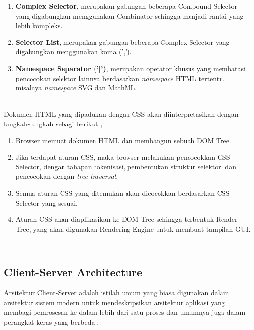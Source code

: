 \documentclass[12pt,a4paper]{article}
\begin{document}
\begin{enumerate}
\begin{itemize}
        \item \textbf{Next-Sibling (+)}, menyatakan operator yang mencocokkan elemen di kanan sebagai elemen pertama yang dikunjungi melalui \textit{parent} kedua elemen tersebut dalam urutan \textit{pre-order traversal}.
        \item \textbf{Column (||)}, menyatakan operator yang mencocokkan simpul yang berada pada sebuah kolom tabel atau grid.
    \end{itemize}
    \item \textbf{Complex Selector}, merupakan gabungan beberapa Compound Selector yang digabungkan menggunakan Combinator sehingga menjadi rantai yang lebih kompleks.
    \item \textbf{Selector List}, merupakan gabungan beberapa Complex Selector yang digabungkan menggunakan koma (',').
    \item \textbf{Namespace Separator ('|')}, merupakan operator khusus yang membatasi pencocokan selektor lainnya berdasarkan \textit{namespace} HTML tertentu, misalnya \textit{namespace} SVG dan MathML.
\end{enumerate} \\


Dokumen HTML yang dipadukan dengan CSS akan diinterpretasikan dengan langkah-langkah sebagi berikut \cite{mozilla-css},
\begin{enumerate}
    \item Browser memuat dokumen HTML dan membangun sebuah DOM Tree.
    \item Jika terdapat aturan CSS, maka browser melakukan pencocokkan CSS Selector, dengan tahapan tokenisasi, pembentukan struktur selektor, dan pencocokan dengan \textit{tree traversal}.
    \item Semua aturan CSS yang ditemukan akan dicocokkan berdasarkan CSS Selector yang sesuai.
    \item Aturan CSS akan diaplikasikan ke DOM Tree sehingga terbentuk Render Tree, yang akan digunakan Rendering Engine untuk membuat tampilan GUI.
\end{enumerate} \\



\subsection{Client-Server Architecture}

Arsitektur Client-Server adalah istilah umum yang biasa digunakan dalam arsitektur sistem modern untuk mendeskripsikan
arsitektur aplikasi yang membagi pemrosesan ke dalam lebih dari satu proses dan umumnya juga dalam perangkat keras yang berbeda \cite{client-server}. \\
\end{document}
